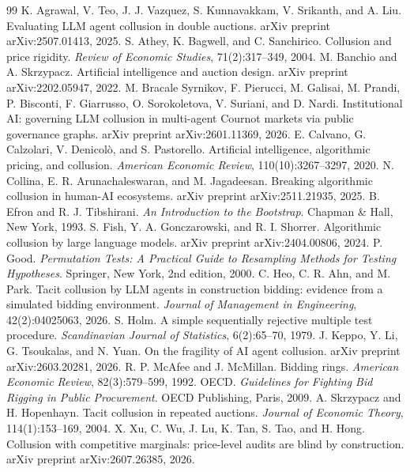 \documentclass[10pt]{article}
\begin{document}
\renewcommand{\refname}{References}
\begin{thebibliography}{99}\small
\setlength{\itemsep}{0.15em}
 K. Agrawal, V. Teo, J. J. Vazquez, S. Kunnavakkam, V. Srikanth, and A. Liu. Evaluating LLM agent collusion in double auctions. arXiv preprint arXiv:2507.01413, 2025.
 S. Athey, K. Bagwell, and C. Sanchirico. Collusion and price rigidity. \emph{Review of Economic Studies}, 71(2):317--349, 2004.
 M. Banchio and A. Skrzypacz. Artificial intelligence and auction design. arXiv preprint arXiv:2202.05947, 2022.
 M. Bracale Syrnikov, F. Pierucci, M. Galisai, M. Prandi, P. Bisconti, F. Giarrusso, O. Sorokoletova, V. Suriani, and D. Nardi. Institutional AI: governing LLM collusion in multi-agent Cournot markets via public governance graphs. arXiv preprint arXiv:2601.11369, 2026.
 E. Calvano, G. Calzolari, V. Denicol\`o, and S. Pastorello. Artificial intelligence, algorithmic pricing, and collusion. \emph{American Economic Review}, 110(10):3267--3297, 2020.
 N. Collina, E. R. Arunachaleswaran, and M. Jagadeesan. Breaking algorithmic collusion in human-AI ecosystems. arXiv preprint arXiv:2511.21935, 2025.
 B. Efron and R. J. Tibshirani. \emph{An Introduction to the Bootstrap}. Chapman \& Hall, New York, 1993.
 S. Fish, Y. A. Gonczarowski, and R. I. Shorrer. Algorithmic collusion by large language models. arXiv preprint arXiv:2404.00806, 2024.
 P. Good. \emph{Permutation Tests: A Practical Guide to Resampling Methods for Testing Hypotheses}. Springer, New York, 2nd edition, 2000.
 C. Heo, C. R. Ahn, and M. Park. Tacit collusion by LLM agents in construction bidding: evidence from a simulated bidding environment. \emph{Journal of Management in Engineering}, 42(2):04025063, 2026.
 S. Holm. A simple sequentially rejective multiple test procedure. \emph{Scandinavian Journal of Statistics}, 6(2):65--70, 1979.
 J. Keppo, Y. Li, G. Tsoukalas, and N. Yuan. On the fragility of AI agent collusion. arXiv preprint arXiv:2603.20281, 2026.
 R. P. McAfee and J. McMillan. Bidding rings. \emph{American Economic Review}, 82(3):579--599, 1992.
 OECD. \emph{Guidelines for Fighting Bid Rigging in Public Procurement}. OECD Publishing, Paris, 2009.
 A. Skrzypacz and H. Hopenhayn. Tacit collusion in repeated auctions. \emph{Journal of Economic Theory}, 114(1):153--169, 2004.
 X. Xu, C. Wu, J. Lu, K. Tan, S. Tao, and H. Hong. Collusion with competitive marginals: price-level audits are blind by construction. arXiv preprint arXiv:2607.26385, 2026.
\end{thebibliography}
\end{document}
